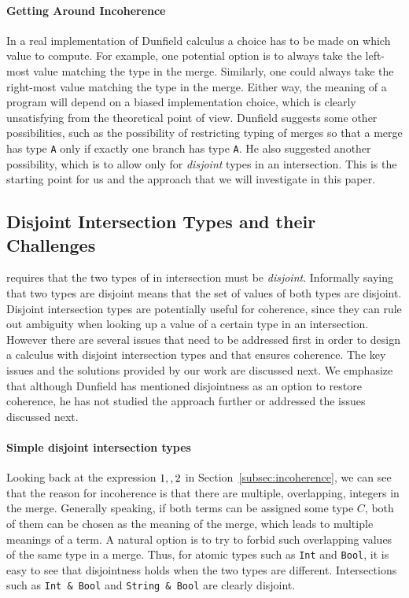 \paragraph{Getting Around Incoherence}
In a real implementation of Dunfield calculus a choice has to be made
on which value to compute. For example, one potential option is to
always take the left-most value matching the type in the
merge. Similarly, one could always take the right-most value matching
the type in the merge. Either way, the meaning of a program will
depend on a biased implementation choice, which is clearly
unsatisfying from the theoretical point of view.  Dunfield suggests
some other possibilities, such as the possibility of restricting typing
of merges so that a merge has type \lstinline$A$ only if exactly one
branch has type \lstinline$A$. He also suggested another possibility,
which is to allow only for \emph{disjoint} types in an intersection.
This is the starting point for us and the approach that we will 
investigate in this paper. 

\subsection{Disjoint Intersection Types and their Challenges}
\name requires that the
two types of in intersection must be \emph{disjoint}.
Informally saying that two types are disjoint means that the set of
values of both types are disjoint. Disjoint intersection types are
potentially useful for coherence, since they can rule out ambiguity
when looking up a value of a certain type in an intersection. However
there are several issues that need to be addressed first in order to
design a calculus with disjoint intersection types and that ensures
coherence. The key issues and the solutions provided by our work are
discussed next. We emphasize that although Dunfield
has mentioned disjointness as an option to restore coherence, he
has not studied the approach further or addressed the issues discussed next.

\paragraph{Simple disjoint intersection types}
Looking back at the expression $1 ,, 2$ in
Section~\ref{subsec:incoherence}, we can see that the reason for
incoherence is that there are multiple, overlapping, integers in the
merge. Generally speaking, if both terms can be assigned some type
$C$, both of them can be chosen as the meaning of the merge, which
leads to multiple meanings of a term. A natural option is to try
to forbid such overlapping values of the same type in a merge.
Thus, for atomic types such as \lstinline$Int$ and \lstinline$Bool$, it is
easy to see that disjointness holds when the two types are
different. Intersections such as \lstinline$Int & Bool$ and 
\lstinline$String & Bool$ are clearly disjoint.

